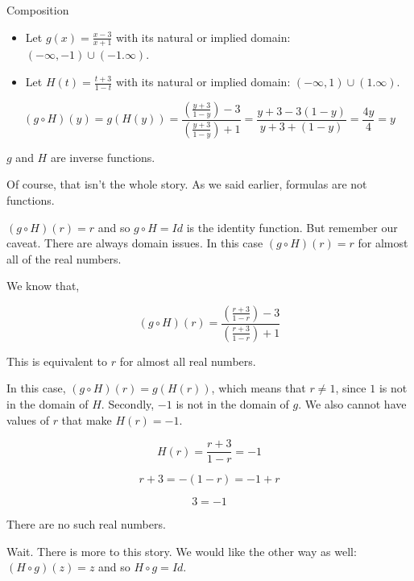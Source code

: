 \documentclass{ximera}
\begin{document}
\begin{example} Composition



\begin{itemize}
\item Let $g(x) = \frac{x-3}{x+1}$ with its natural or implied domain: $(-\infty, -1) \cup (-1. \infty)$. \\

\item Let $H(t) = \frac{t+3}{1-t}$ with its natural or implied domain: $(-\infty, 1) \cup (1. \infty)$.
\end{itemize}



\[
(g \circ H)(y) = g(H(y)) = \frac{\left( \frac{y+3}{1-y} \right) - 3}{\left(  \frac{y+3}{1-y}\right) + 1} = \frac{y+3-3(1-y)}{y+3+(1-y)} = \frac{4y}{4} = y
\]



$g$ and $H$ are inverse functions.




\end{example}

Of course, that isn't the whole story.  As we said earlier, formulas are not functions. 

$(g \circ H)(r) = r$ and so $g \circ H = Id$ is the identity function.  But remember our caveat.  There are always domain issues.  In this case $(g \circ H)(r) = r$ for almost all of the real numbers.

We know that, 


\[
(g \circ H)(r) = \frac{\left( \frac{r+3}{1-r} \right) - 3}{\left(  \frac{r+3}{1-r}\right) + 1} 
\]


This is equivalent to $r$ for almost all real numbers.


In this case, $(g \circ H)(r) = g(H(r))$, which means that $r \ne 1$, since $1$ is not in the domain of $H$.  Secondly, $-1$ is not in the domain of $g$.  We also cannot have values of $r$ that make $H(r) = -1$.




\[
H(r) = \frac{r+3}{1-r} = -1
\]

\[
r + 3 = -(1-r) = -1 + r
\]


\[
3 = -1
\]


There are no such real numbers.


Wait.  There is more to this story. We would like the other way as well: $(H \circ g)(z) = z$ and so $H \circ g = Id$.
\end{document}
